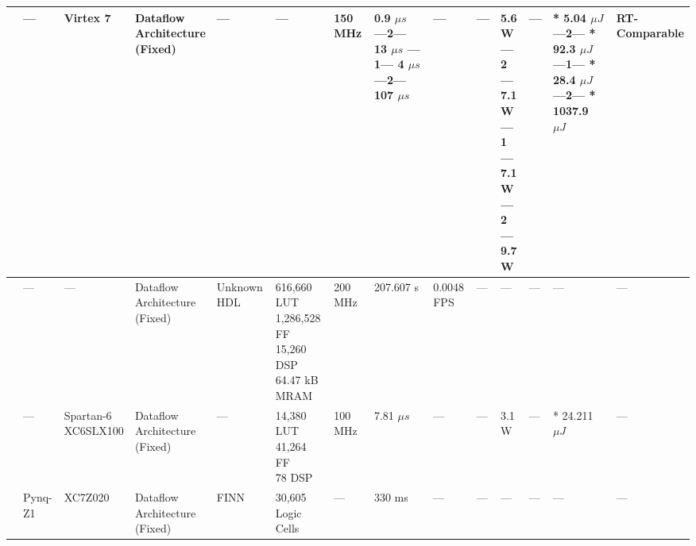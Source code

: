 \begin{center}
{\begin{tabular}{llllllllllllll}
\cite{gankidiFPGAArchitectureDeep2017} & --- & Virtex 7 & \makecell[tl]{Dataflow\\ Architecture\\ (Fixed)} & --- & --- & 150 MHz & \makecell[tl]{0.9 $\mu s$\\ ---2---\\ 13 $\mu s$\\ ---1---\\ 4 $\mu s$\\ ---2---\\ 107 $\mu s$} & --- & --- & \makecell[tl]{5.6 W\\ ---2---\\ 7.1 W\\ ---1---\\ 7.1 W\\ ---2---\\ 9.7 W} & --- & \makecell[tl]{* 5.04 $\mu J$\\ ---2---\\ * 92.3 $\mu J$\\ ---1---\\ * 28.4 $\mu J$\\ ---2---\\ * 1037.9 $\mu J$} & \makecell[tl]{RT-\\Comparable} \\ \hline
\cite{chenFPGABasedImplementation2018} & --- & --- & \makecell[tl]{Dataflow\\ Architecture\\ (Fixed)} & Unknown HDL & \makecell[tl]{616,660 LUT\\ 1,286,528 FF\\ 15,260 DSP\\ 64.47 kB MRAM} & 200 MHz & 207.607 s & 0.0048 FPS & --- & --- & --- & --- & --- \\ \hline
\cite{jainExplorationFPGABased2018} & --- & \makecell[tl]{Spartan-6\\ XC6SLX100} & \makecell[tl]{Dataflow\\ Architecture\\ (Fixed)} & --- & \makecell[tl]{14,380 LUT\\ 41,264 FF\\ 78 DSP} & 100 MHz & 7.81 $\mu s$ & --- & --- & 3.1 W & --- & * 24.211 $\mu J$ & --- \\ \hline
\cite{hashimotoShipClassificationSAR2018} & Pynq-Z1 & XC7Z020 & \makecell[tl]{Dataflow\\ Architecture\\ (Fixed)} & FINN & \makecell[tl]{30,605\\ Logic Cells} & --- & 330 ms & --- & --- & --- & --- & --- & --- \\ \hline

\end{tabular}}
\end{center}
